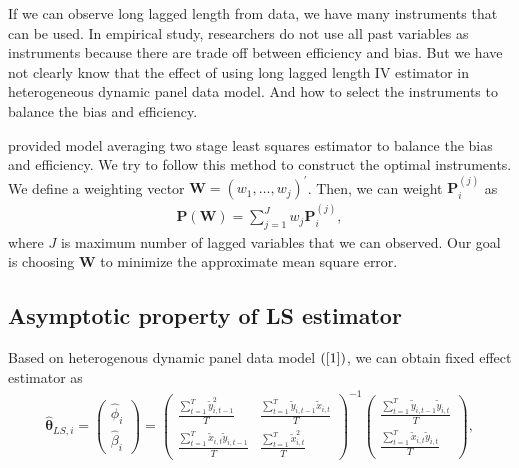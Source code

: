 \documentclass[12pt,a4paper,hyperref]{article}
\begin{document}
If we can observe long lagged length from data, we have many instruments that can be used.
In empirical study, researchers do not use all past variables as instruments because there are trade off between efficiency and bias.
But we have not clearly know that the effect of using long lagged length  IV estimator in heterogeneous dynamic panel data model. And how to select the instruments to balance the bias and efficiency.

\citet{Kuersteiner:2010} provided model averaging two stage least squares estimator to balance the bias and efficiency. We try to follow this method to construct the optimal instruments. We define a weighting vector $\boldsymbol{W}=\left(w_{1}, \ldots, w_{j} \right)^{'}$. Then, we can weight $\boldsymbol{P}^{(j)}_{i}$ as
\begin{align}
\boldsymbol{P}\left(\boldsymbol{W} \right)= \sum^{J}_{j=1}w_{j} \boldsymbol{P}^{(j)}_{i},
\end{align}
where $J$ is maximum number of lagged variables that we can observed. 
Our goal is choosing $\boldsymbol{W}$ to minimize the approximate mean square error. 



\subsection{Asymptotic property of LS estimator}


Based on heterogenous dynamic panel data model $(\ref{1})$, we can obtain fixed effect estimator as
\begin{align}
\hat{\boldsymbol{\theta}}_{LS,i}=
\begin{pmatrix}
\hat{\phi}_{i} \\
\hat{\beta}_{i}
\end{pmatrix}=
\begin{pmatrix}
\frac{\sum^{T}_{t=1}\tilde{y}^{2}_{i,t-1}}{T} & \frac{\sum^{T}_{t=1}\tilde{y}_{i,t-1}\tilde{x}_{i,t}}{T} \\
\frac{\sum^{T}_{t=1}\tilde{x}_{i,t}\tilde{y}_{i,t-1}}{T} &  \frac{\sum^{T}_{t=1}\tilde{x}_{i,t}^{2}}{T}
\end{pmatrix}^{-1}
\begin{pmatrix}
\frac{\sum^{T}_{t=1}\tilde{y}_{i,t-1}\tilde{y}_{i,t}}{T} \\
\frac{\sum^{T}_{t=1}\tilde{x}_{i,t}\tilde{y}_{i,t}}{T}
\end{pmatrix},
\end{align}
\end{document}

